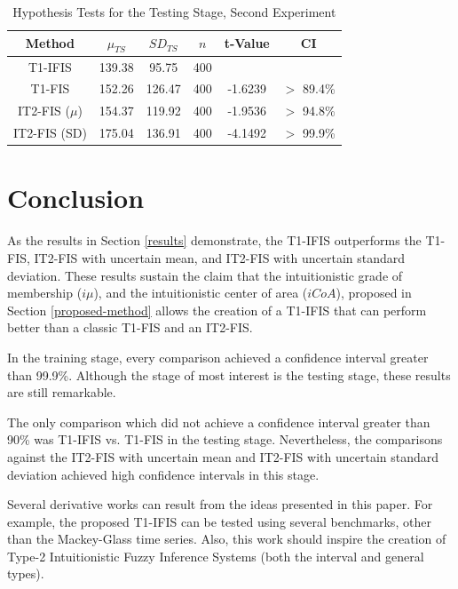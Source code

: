 \documentclass[conference]{IEEEtran}
\begin{document}
\begin{table}[!t]
  \renewcommand{\arraystretch}{1.3}
  \caption{Hypothesis Tests for the Testing Stage, Second Experiment}
  \label{second-hypothesis-tests-testing}
  \centering
  \begin{tabular}{|c|c|c|c|c|c|}
    \hline
    Method & $\mu_{TS}$ & $SD_{TS}$ & $n$ & t-Value & CI\\
    \hline
    T1-IFIS & 139.38 & 95.75 & 400 &  &  \\
    \hline
    T1-FIS & 152.26 & 126.47 & 400 & -1.6239 & $>$ 89.4\% \\
    \hline
    IT2-FIS (\(\mu\)) & 154.37 & 119.92 & 400 & -1.9536 & $>$ 94.8\% \\
    \hline
    IT2-FIS (SD) & 175.04 & 136.91 & 400 & -4.1492 & $>$ 99.9\%\\
    \hline
  \end{tabular}
\end{table}

\section{Conclusion}
\label{conclusion}

As the results in Section \ref{results} demonstrate, the T1-IFIS
outperforms the T1-FIS, IT2-FIS with uncertain mean, and IT2-FIS with
uncertain standard deviation. These results sustain the claim that the
intuitionistic grade of membership ($i\mu$), and the intuitionistic center
of area ($iCoA$), proposed in Section \ref{proposed-method} allows the
creation of a T1-IFIS that can perform better than a classic T1-FIS
and an IT2-FIS.

In the training stage, every comparison achieved a confidence interval
greater than 99.9\%. Although the stage of most interest is the
testing stage, these results are still remarkable.

The only comparison which did not achieve a confidence interval
greater than 90\% was T1-IFIS vs. T1-FIS in the testing
stage. Nevertheless, the comparisons against the IT2-FIS with
uncertain mean and IT2-FIS with uncertain standard deviation achieved
high confidence intervals in this stage.

Several derivative works can result from the ideas presented in this paper. For
example, the proposed T1-IFIS can be tested using several
benchmarks, other than the Mackey-Glass time series. Also, this work
should inspire the creation of Type-2 Intuitionistic Fuzzy Inference
Systems (both the interval and general types).
\end{document}

